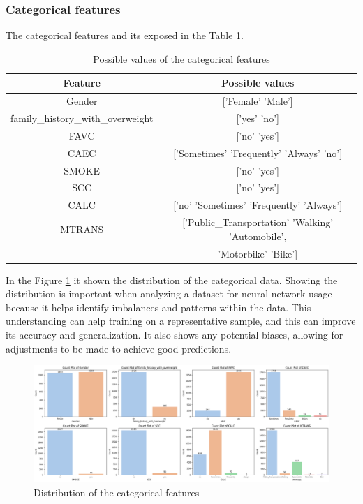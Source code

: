 \documentclass[11pt, a4paper]{article}
\begin{document}
\subsubsection{Categorical features}

The categorical features and its exposed in the Table \ref{tab:table_categorical_values}.

\begin{table}[H]
    \centering
    \begin{tabular}{|c|c|}
        \hline
        \textbf{Feature} & \textbf{Possible values} \\ \hline
        Gender & ['Female' 'Male'] \\ \hline
        family\_history\_with\_overweight & ['yes' 'no'] \\ \hline
        FAVC & ['no' 'yes'] \\ \hline
        CAEC & ['Sometimes' 'Frequently' 'Always' 'no'] \\ \hline
        SMOKE & ['no' 'yes'] \\ \hline
        SCC & ['no' 'yes'] \\ \hline
        CALC & ['no' 'Sometimes' 'Frequently' 'Always'] \\ \hline
        MTRANS & ['Public\_Transportation' 'Walking' 'Automobile', \\
               & 'Motorbike' 'Bike'] \\ \hline
    \end{tabular}
    \caption{Possible values of the categorical features}
    \label{tab:table_categorical_values}
\end{table}

In the Figure \ref{fig:image_distribution_categorical_features} it shown the distribution of the categorical data. Showing the distribution 
is important when analyzing a dataset for neural network usage because it helps identify imbalances and patterns within the data. This understanding 
can help training on a representative sample, and this can improve its accuracy and generalization. It also shows any potential biases, allowing for 
adjustments to be made to achieve good predictions.

\begin{figure}[H]
    \centering
    \includegraphics[width=\textwidth]{images/distribution_categorical_features.png}
    \caption{Distribution of the categorical features}
    \label{fig:image_distribution_categorical_features}
  \end{figure}
\end{document}
